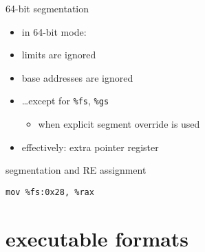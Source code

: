 \begin{frame}{64-bit segmentation}
\begin{itemize}
\item in 64-bit mode:
\item limits are ignored
\item base addresses are ignored
\item \ldots except for {\tt \%fs}, {\tt \%gs}
    \begin{itemize}
    \item when explicit segment override is used
    \end{itemize}
\item effectively: extra pointer register
\end{itemize}
\end{frame}

\begin{frame}[fragile,label=segAndRE]{segmentation and RE assignment}
\begin{lstlisting}
mov %fs:0x28, %rax
\end{lstlisting}
\end{frame}

\section{executable formats}

